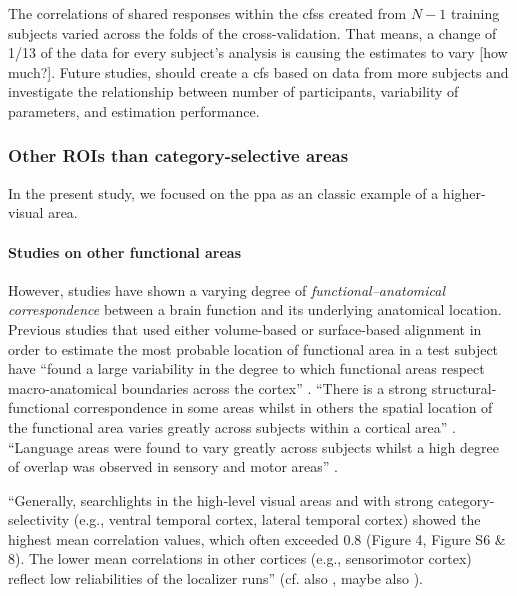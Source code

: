 
The correlations of shared responses within the \acp{cfs} created from $N-1$
training subjects varied across the folds of the cross-validation.
That means, a change of 1/13 of the data for every subject's analysis is causing
the estimates to vary [how much?].
Future studies, should create a \ac{cfs} based on data from more subjects and
investigate the relationship between number of participants, variability of
parameters, and estimation performance.



\subsubsection{Other ROIs than category-selective areas}

%
In the present study, we focused on the \ac{ppa} as an classic example of a
higher-visual area.


\paragraph{Studies on other functional areas}
%
However, studies have shown a varying degree of \textit{functional--anatomical
correspondence} between a brain function and its underlying anatomical location.
%
Previous studies that used either volume-based \citep{zhen2017quantifying,
zhen2015quantifying} or surface-based alignment \citep{rosenke2021probabilistic,
frost2012measuring} in order to estimate the most probable location of
functional area in a test subject have ``found a large variability in the degree
to which functional areas respect macro-anatomical boundaries across the
cortex'' \citep{frost2012measuring}.
%
``There is a strong structural-functional correspondence in some areas whilst in
others the spatial location of the functional area varies greatly across
subjects within a cortical area'' \citep{frost2012measuring}.
%
``Language areas were found to vary greatly across subjects whilst a high degree
of overlap was observed in sensory and motor areas'' \citep{frost2012measuring}.


``Generally, searchlights in the high-level visual areas and with strong
category-selectivity (e.g., ventral temporal cortex, lateral temporal cortex)
showed the highest mean correlation values, which often exceeded 0.8 (Figure 4,
Figure S6 \& 8). The lower mean correlations in other cortices (e.g.,
sensorimotor cortex) reflect low reliabilities of the localizer runs''
\citep{jiahui2022cross} (cf. also \citet{jiahui2020}, maybe also
\citet{feilong2022individualized}).

